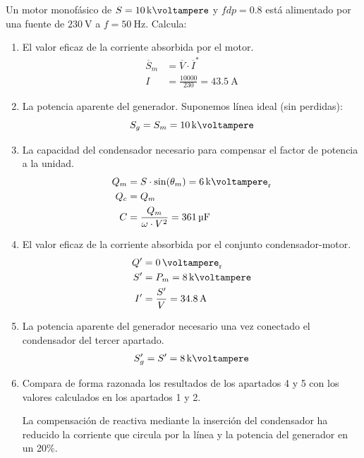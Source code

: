 \documentclass[12pt]{article}
\begin{document}
Un motor monofásico de $S = \SI{10}{\kilo\voltampere}$ y $fdp = 0.8$ está alimentado por una fuente de $\SI{230}{\volt}$ a $f = \SI{50}{\hertz}$. 
Calcula:
\begin{enumerate}
\item El valor eficaz de la corriente absorbida por el motor.
\begin{align*}
  \overline{S}_m &= \overline{V} \cdot \overline{I}^*\\
%
  I &= \frac{\num{10000}}{230} = \SI{43.5}{\ampere}
\end{align*}

\item La potencia aparente del generador.
Suponemos línea ideal (sin perdidas):
\[
  S_g = S_m = \SI{10}{\kilo\voltampere} 
\]

\item La capacidad del condensador necesario para compensar el factor de potencia a la unidad.
\begin{align*}
Q_m &= S \cdot \sin(\theta_m) = \SI{6}{\kilo\voltampere_r}\\
Q_c &= Q_m\\
C &= \frac{Q_m}{\omega \cdot V^2} = \SI{361}{\micro\farad}
\end{align*}

\item El valor eficaz de la corriente absorbida por el conjunto condensador-motor. 
\begin{align*}
Q' &= \SI{0}{\voltampere_r}\\
S' &= P_m = \SI{8}{\kilo\voltampere}\\
I' &= \frac{S'}{V} = \SI{34.8}{\ampere}
\end{align*}

\item La potencia aparente del generador necesario una vez conectado el condensador del tercer apartado.
\begin{align*}
S'_g &= S' = \SI{8}{\kilo\voltampere}\\
\end{align*}

\item Compara de forma razonada los resultados de los apartados 4 y 5 con los valores calculados en los apartados 1 y 2.

  La compensación de reactiva mediante la inserción del condensador ha reducido la corriente que circula por la línea y la potencia del generador en un 20\%.

\end{enumerate}
\end{document}
